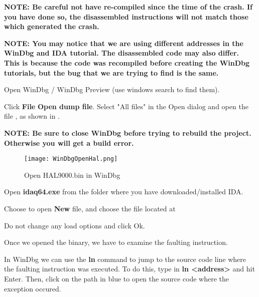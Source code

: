 \begin{appendices}
\textbf{NOTE: Be careful not have re-compiled \projectname since the time of the crash.
If you have done so, the disassembled instructions will not match those which generated the crash.}

\textbf{NOTE: You may notice that we are using different addresses in the WinDbg and IDA tutorial.
The disassembled code may also differ. This is because the code was recompiled before creating the WinDbg tutorials, 
but the bug that we are trying to find is the same.}

\begin{tcolorbox}[width=\textwidth,colback={yellow},title={WinDbg},colbacktitle=yellow,coltitle=black]    
	Open WinDbg / WinDbg Preview (use windows search to find them).

	Click \textbf{File} \textrightarrow \textbf{Open dump file}. Select "All files" in the Open dialog
	and open the file , as shown in .

	\textbf{NOTE: Be sure to close WinDbg before trying to rebuild the project. 
	Otherwise you will get a build error.}
\end{tcolorbox}    
\begin{figure}[]
	\centering
	\texttt{[image: WinDbgOpenHal.png]}
	\caption{Open HAL9000.bin in WinDbg}
	\label{fig:WinDbgOpenHal}
\end{figure}

\begin{tcolorbox}[width=\textwidth,colback={green},title={IDA},colbacktitle=green,coltitle=black]    
	Open \textbf{idaq64.exe} from the folder where you have downloaded/installed IDA.

	Choose to open \textbf{New} file, and choose the file located at 

	Do not change any load options and click Ok.
\end{tcolorbox}  

Once we opened the binary, we have to examine the faulting instruction.

\begin{tcolorbox}[width=\textwidth,colback={yellow},title={WinDbg},colbacktitle=yellow,coltitle=black]    
	In WinDbg we can use the \textbf{ln} command to jump to the source code line
	where the faulting instruction was executed.
	To do this, type in \textbf{ln <address>} and hit Enter. 
	Then, click on the path in blue to open the source code where the exception occured.


\end{tcolorbox}
\end{appendices}
